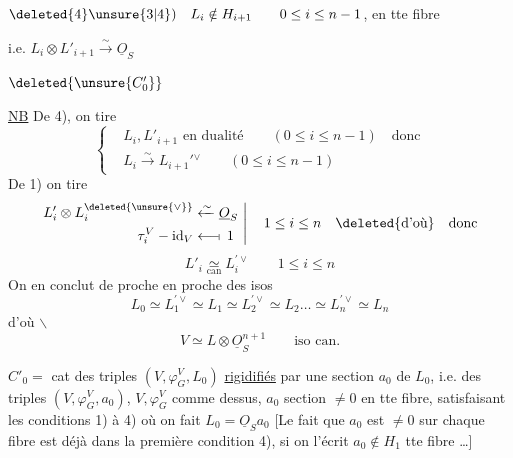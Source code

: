 $\deleted{4}\unsure{3|4})\quad L_i\notin H_{i+1}\qquad 0\leq i\leq n-1$, en tte fibre

i.e. $L_i\otimes L'_{i+1}\xrightarrow{\sim}\underline O_S$ 

$\deleted{\unsure{C'_0}}$


\uline{NB} De 4), on tire
\[
\left\{\begin{aligned}
&L_i,L'_{i+1}\text{ en dualité}\qquad (0\leq i\leq n-1)\quad\text{donc}\\
&L_i\xrightarrow{\sim}L_{i+1}'{}^\vee\qquad (0\leq i\leq n-1)
\end{aligned}\right.
\]
De 1) on tire
\[
\left.\begin{aligned}
L'_i\otimes L_i^{\deleted{\unsure{\vee}}}&\xleftarrow{\sim}\underline O_S\\
\tau_i^V-\mathrm{id}_V&\longleftarrow\!\shortmid\,1
\end{aligned}\ \right|\quad 1\leq i\leq n\quad \deleted{\text{d'où}}\quad\text{donc}
\]
\[
L'_i\underset{\mathrm{can}}{\simeq} L_i^{\prime\vee}\qquad 1\leq i\leq n
\]
On en conclut de proche en proche des isos
\[
L_0\simeq L_1^{\prime\vee}\simeq L_1\simeq L_2^{\prime\vee}\simeq L_2\ldots\simeq L_n^{\prime\vee}\simeq L_n
\]
d'où $\backslash$
\[
V\simeq L\otimes\underline O_S^{n+1}\qquad\text{iso can.}
\]

$\boxed{C'_0}={}$ cat des triples $(V,\varphi_G^V,L_0)$ \uline{rigidifiés} par une section $a_0$ de $L_0$, i.e. des triples $(V,\varphi_G^V,a_0)$,  $V,\varphi_G^V$ comme dessus, $a_0$ section $\ne0$ en tte fibre, satisfaisant les conditions 1) à 4) où on fait $L_0=\underline O_S a_0$ [Le fait que $a_0$ est $\ne0$ sur chaque fibre est déjà  dans la première condition 4), si on l'écrit $a_0\notin H_1$  tte fibre \ldots]


